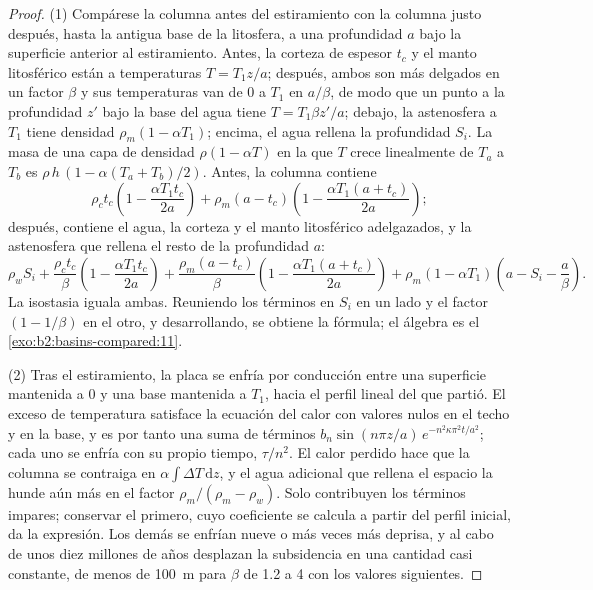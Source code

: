 \begin{proof}
(1) Compárese la columna antes del estiramiento con la columna justo después, hasta la antigua base de
la litosfera, a una profundidad $a$ bajo la superficie anterior al estiramiento. Antes, la corteza de
espesor $t_c$ y el manto litosférico están a temperaturas $T = T_1 z/a$; después, ambos son
más delgados en un factor $\beta$ y sus temperaturas van de $0$ a $T_1$ en $a/\beta$, de modo que un punto
a la profundidad $z'$ bajo la base del agua tiene $T = T_1\beta z'/a$; debajo, la astenosfera a
$T_1$ tiene densidad $\rho_m(1 - \alpha T_1)$; encima, el agua rellena la profundidad $S_i$. La masa de una
capa de densidad $\rho(1 - \alpha T)$ en la que $T$ crece linealmente de $T_a$ a $T_b$ es
$\rho\,h\,(1 - \alpha(T_a + T_b)/2)$. Antes, la columna contiene
\[
  \rho_c t_c\left(1 - \frac{\alpha T_1 t_c}{2a}\right)
  + \rho_m (a - t_c)\left(1 - \frac{\alpha T_1 (a + t_c)}{2a}\right);
\]
después, contiene el agua, la corteza y el manto litosférico adelgazados, y la astenosfera que
rellena el resto de la profundidad $a$:
\[
  \rho_w S_i + \frac{\rho_c t_c}{\beta}\left(1 - \frac{\alpha T_1 t_c}{2a}\right)
  + \frac{\rho_m (a - t_c)}{\beta}\left(1 - \frac{\alpha T_1 (a + t_c)}{2a}\right)
  + \rho_m(1 - \alpha T_1)\left(a - S_i - \frac{a}{\beta}\right).
\]
La isostasia iguala ambas. Reuniendo los términos en $S_i$ en un lado y el factor
$(1 - 1/\beta)$ en el otro, y desarrollando, se obtiene la fórmula; el álgebra es el
\cref{exo:b2:basins-compared:11}.

(2) Tras el estiramiento, la placa se enfría por conducción entre una superficie mantenida a $0$ y una base mantenida
a $T_1$, hacia el perfil lineal del que partió. El exceso de temperatura satisface la ecuación del
calor con valores nulos en el techo y en la base, y es por tanto una suma de términos
$b_n\sin(n\pi z/a)\,e^{-n^2\kappa\pi^2 t/a^2}$; cada uno se enfría con su propio tiempo, $\tau/n^2$. El
calor perdido hace que la columna se contraiga en $\alpha\int \Delta T\,\mathrm{d}z$, y el agua adicional
que rellena el espacio la hunde aún más en el factor $\rho_m/(\rho_m - \rho_w)$. Solo contribuyen los términos
impares; conservar el primero, cuyo coeficiente se calcula a partir del perfil inicial, da
la expresión. Los demás se enfrían nueve o más veces más deprisa, y al cabo de unos diez millones de años
desplazan la subsidencia en una cantidad casi constante, de menos de \qty{100}{m} para $\beta$ de
1.2 a 4 con los valores siguientes.
\end{proof}

